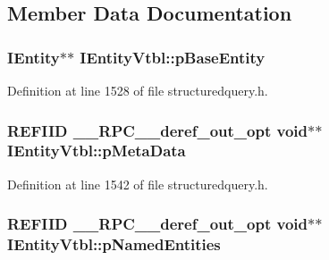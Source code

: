\subsection{Member Data Documentation}
\subsubsection[{\texorpdfstring{p\+Base\+Entity}{pBaseEntity}}]{ {\bf I\+Entity}$\ast$$\ast$ I\+Entity\+Vtbl\+::p\+Base\+Entity}\hypertarget{struct_i_entity_vtbl_ae76ca5d36442b81aecf724bf081fe779}{}\label{struct_i_entity_vtbl_ae76ca5d36442b81aecf724bf081fe779}


Definition at line 1528 of file structuredquery.\+h.

\subsubsection[{\texorpdfstring{p\+Meta\+Data}{pMetaData}}]{ {\bf R\+E\+F\+I\+ID} {\bf \+\_\+\+\_\+\+R\+P\+C\+\_\+\+\_\+deref\+\_\+out\+\_\+opt} {\bf void}$\ast$$\ast$ I\+Entity\+Vtbl\+::p\+Meta\+Data}\hypertarget{struct_i_entity_vtbl_a8f9dfcaa757d33b4e78273af11973c5c}{}\label{struct_i_entity_vtbl_a8f9dfcaa757d33b4e78273af11973c5c}


Definition at line 1542 of file structuredquery.\+h.

\subsubsection[{\texorpdfstring{p\+Named\+Entities}{pNamedEntities}}]{ {\bf R\+E\+F\+I\+ID} {\bf \+\_\+\+\_\+\+R\+P\+C\+\_\+\+\_\+deref\+\_\+out\+\_\+opt} {\bf void}$\ast$$\ast$ I\+Entity\+Vtbl\+::p\+Named\+Entities}\hypertarget{struct_i_entity_vtbl_a0656e65ddb28feffabbb3b5598e81034}{}\label{struct_i_entity_vtbl_a0656e65ddb28feffabbb3b5598e81034}


